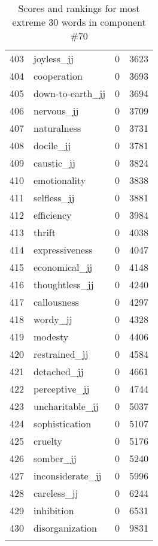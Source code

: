 \begin{longtable}[!htbp]{| rlr@{.}l |}
    403 & joyless\_jj & 0 & 3623 \\
    404 & cooperation & 0 & 3693 \\
    405 & down-to-earth\_jj & 0 & 3694 \\
    406 & nervous\_jj & 0 & 3709 \\
    407 & naturalness & 0 & 3731 \\
    408 & docile\_jj & 0 & 3781 \\
    409 & caustic\_jj & 0 & 3824 \\
    410 & emotionality & 0 & 3838 \\
    411 & selfless\_jj & 0 & 3881 \\
    412 & efficiency & 0 & 3984 \\
    413 & thrift & 0 & 4038 \\
    414 & expressiveness & 0 & 4047 \\
    415 & economical\_jj & 0 & 4148 \\
    416 & thoughtless\_jj & 0 & 4240 \\
    417 & callousness & 0 & 4297 \\
    418 & wordy\_jj & 0 & 4328 \\
    419 & modesty & 0 & 4406 \\
    420 & restrained\_jj & 0 & 4584 \\
    421 & detached\_jj & 0 & 4661 \\
    422 & perceptive\_jj & 0 & 4744 \\
    423 & uncharitable\_jj & 0 & 5037 \\
    424 & sophistication & 0 & 5107 \\
    425 & cruelty & 0 & 5176 \\
    426 & somber\_jj & 0 & 5240 \\
    427 & inconsiderate\_jj & 0 & 5996 \\
    428 & careless\_jj & 0 & 6244 \\
    429 & inhibition & 0 & 6531 \\
    430 & disorganization & 0 & 9831 \\
    \hline
    \caption{Scores and rankings for most extreme 30 words in component \#70} \\
\end{longtable}
